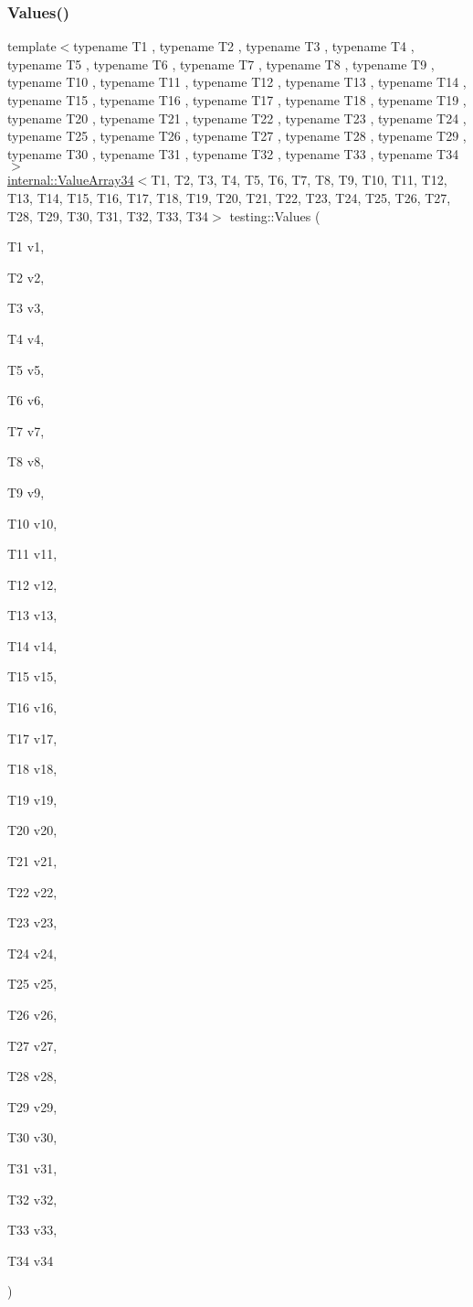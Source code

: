 \subsubsection{\texorpdfstring{Values()}{Values()}\hspace{0.1cm}{\footnotesize\ttfamily [34/50]}}
{\footnotesize\ttfamily template$<$typename T1 , typename T2 , typename T3 , typename T4 , typename T5 , typename T6 , typename T7 , typename T8 , typename T9 , typename T10 , typename T11 , typename T12 , typename T13 , typename T14 , typename T15 , typename T16 , typename T17 , typename T18 , typename T19 , typename T20 , typename T21 , typename T22 , typename T23 , typename T24 , typename T25 , typename T26 , typename T27 , typename T28 , typename T29 , typename T30 , typename T31 , typename T32 , typename T33 , typename T34 $>$ \\
\mbox{\hyperlink{classtesting_1_1internal_1_1ValueArray34}{internal\+::\+Value\+Array34}}$<$T1, T2, T3, T4, T5, T6, T7, T8, T9, T10, T11, T12, T13, T14, T15, T16, T17, T18, T19, T20, T21, T22, T23, T24, T25, T26, T27, T28, T29, T30, T31, T32, T33, T34$>$ testing\+::\+Values (\begin{DoxyParamCaption}\item[{T1}]{v1,  }\item[{T2}]{v2,  }\item[{T3}]{v3,  }\item[{T4}]{v4,  }\item[{T5}]{v5,  }\item[{T6}]{v6,  }\item[{T7}]{v7,  }\item[{T8}]{v8,  }\item[{T9}]{v9,  }\item[{T10}]{v10,  }\item[{T11}]{v11,  }\item[{T12}]{v12,  }\item[{T13}]{v13,  }\item[{T14}]{v14,  }\item[{T15}]{v15,  }\item[{T16}]{v16,  }\item[{T17}]{v17,  }\item[{T18}]{v18,  }\item[{T19}]{v19,  }\item[{T20}]{v20,  }\item[{T21}]{v21,  }\item[{T22}]{v22,  }\item[{T23}]{v23,  }\item[{T24}]{v24,  }\item[{T25}]{v25,  }\item[{T26}]{v26,  }\item[{T27}]{v27,  }\item[{T28}]{v28,  }\item[{T29}]{v29,  }\item[{T30}]{v30,  }\item[{T31}]{v31,  }\item[{T32}]{v32,  }\item[{T33}]{v33,  }\item[{T34}]{v34 }\end{DoxyParamCaption})}

